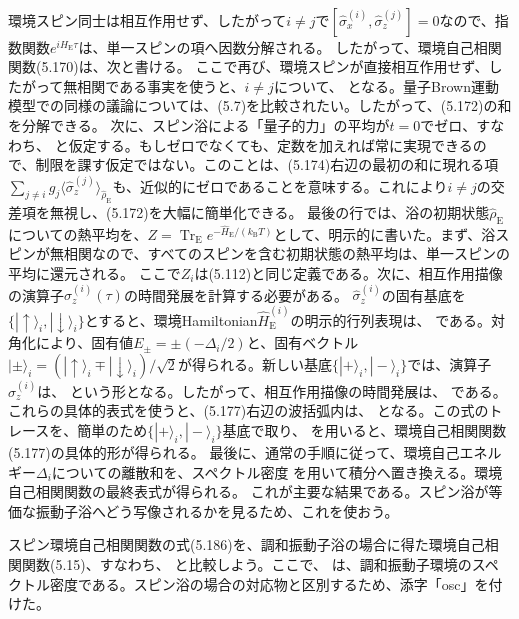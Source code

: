 環境スピン同士は相互作用せず、したがって$i\ne j$で$[\hat\sigma_x^{(i)},\hat\sigma_z^{(j)}]=0$なので、指数関数$e^{i\hat H_{\mathrm E}\tau}$は、単一スピンの項へ因数分解される。
したがって、環境自己相関関数(5.170)は、次と書ける。
ここで再び、環境スピンが直接相互作用せず、したがって無相関である事実を使うと、$i\ne j$について、
となる。量子Brown運動模型での同様の議論については、(5.7)を比較されたい。したがって、(5.172)の和を分解できる。
次に、スピン浴による「量子的力」の平均が$t=0$でゼロ、すなわち、
と仮定する。もしゼロでなくても、定数を加えれば常に実現できるので、制限を課す仮定ではない。このことは、(5.174)右辺の最初の和に現れる項$\sum_{j\ne i}g_j\langle\hat\sigma_z^{(j)}\rangle_{\hat\rho_{\mathrm E}}$も、近似的にゼロであることを意味する。これにより$i\ne j$の交差項を無視し、(5.172)を大幅に簡単化できる。
最後の行では、浴の初期状態$\hat\rho_{\mathrm E}$についての熱平均を、$Z=\operatorname{Tr}_{\mathrm E}e^{-\hat H_{\mathrm E}/(k_{\mathrm B}T)}$として、明示的に書いた。まず、浴スピンが無相関なので、すべてのスピンを含む初期状態の熱平均は、単一スピンの平均に還元される。
\hypertarget{srcpage:231}{}\label{srcpage:231}
ここで$Z_i$は(5.112)と同じ定義である。次に、相互作用描像の演算子$\hat\sigma_z^{(i)}(\tau)$の時間発展を計算する必要がある。
$\hat\sigma_z^{(i)}$の固有基底を$\{|\uparrow\rangle_i,|\downarrow\rangle_i\}$とすると、環境Hamiltonian$\hat H_{\mathrm E}^{(i)}$の明示的行列表現は、
である。対角化により、固有値$E_\pm=\pm(-\Delta_i/2)$と、固有ベクトル$|\pm\rangle_i=(|\uparrow\rangle_i\mp|\downarrow\rangle_i)/\sqrt2$が得られる。新しい基底$\{|+\rangle_i,|-\rangle_i\}$では、演算子$\hat\sigma_z^{(i)}$は、
という形となる。したがって、相互作用描像の時間発展は、
である。これらの具体的表式を使うと、(5.177)右辺の波括弧内は、
となる。この式のトレースを、簡単のため$\{|+\rangle_i,|-\rangle_i\}$基底で取り、
を用いると、環境自己相関関数(5.177)の具体的形が得られる。
最後に、通常の手順に従って、環境自己エネルギー$\Delta_i$についての離散和を、スペクトル密度
\hypertarget{srcpage:232}{}\label{srcpage:232}
を用いて積分へ置き換える。環境自己相関関数の最終表式が得られる。
これが主要な結果である。スピン浴が等価な振動子浴へどう写像されるかを見るため、これを使おう。

スピン環境自己相関関数の式(5.186)を、調和振動子浴の場合に得た環境自己相関関数(5.15)、すなわち、
と比較しよう。ここで、
は、調和振動子環境のスペクトル密度である。スピン浴の場合の対応物と区別するため、添字「osc」を付けた。

